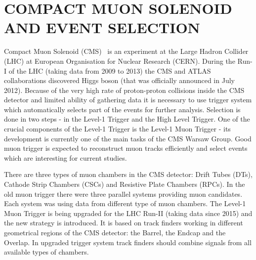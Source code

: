 \section{COMPACT MUON SOLENOID AND EVENT SELECTION}
\label{sec:1_CMS}
Compact Muon Solenoid (CMS)~\cite{CMS-JINST} is an experiment at the Large Hadron Collider (LHC) at European Organisation for Nuclear Research (CERN). During the Run-I of the LHC (taking data from 2009 to 2013) the CMS and ATLAS collaborations discovered Higgs boson (that was officially announced in July 2012). Because of the very high rate of proton-proton collisions inside the CMS detector and limited ability of gathering data it is necessary to use trigger system which automatically selects part of the events for further analysis. Selection is done in two steps - in the Level-1 Trigger and the High Level Trigger. One of the crucial components of the Level-1 Trigger is the Level-1 Muon Trigger - its development is currently one of the main tasks of the CMS Warsaw Group. Good muon trigger is expected to reconstruct muon tracks efficiently and select events which are interesting for current studies. 

There are three types of muon chambers in the CMS detector: Drift Tubes (DTs), Cathode Strip Chambers (CSCs) and Resistive Plate Chambers (RPCs). In the old muon trigger there were three parallel systems providing muon candidates. Each system was using data from different type of muon chambers. The Level-1 Muon Trigger is being upgraded for the LHC Run-II (taking data since 2015) and the new strategy is introduced. It is based on track finders working in different geometrical regions of the CMS detector: the Barrel, the Endcap and the Overlap. In upgraded trigger system track finders should combine signals from all available types of chambers.

